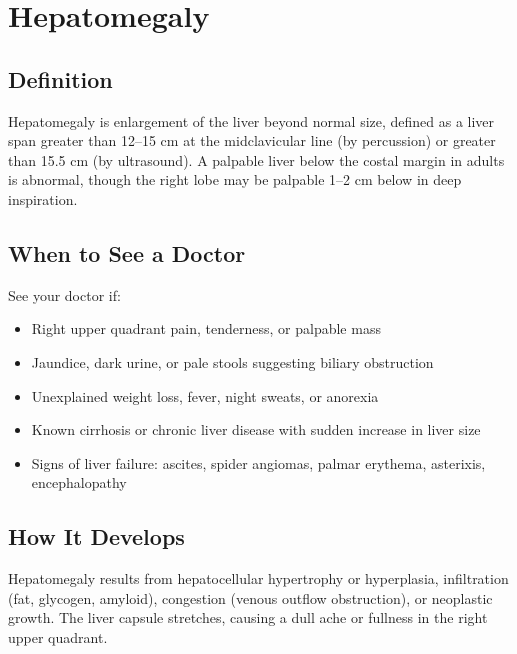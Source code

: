 \chapter{Hepatomegaly}

\section*{Definition}
Hepatomegaly is enlargement of the liver beyond normal size, defined as a liver span greater than 12--15 cm at the midclavicular line (by percussion) or greater than 15.5 cm (by ultrasound). A palpable liver below the costal margin in adults is abnormal, though the right lobe may be palpable 1--2 cm below in deep inspiration.

\section*{When to See a Doctor}
See your doctor if:
\begin{itemize}
  \item Right upper quadrant pain, tenderness, or palpable mass
  \item Jaundice, dark urine, or pale stools suggesting biliary obstruction
  \item Unexplained weight loss, fever, night sweats, or anorexia
  \item Known cirrhosis or chronic liver disease with sudden increase in liver size
  \item Signs of liver failure: ascites, spider angiomas, palmar erythema, asterixis, encephalopathy
\end{itemize}

\section*{How It Develops}
Hepatomegaly results from hepatocellular hypertrophy or hyperplasia, infiltration (fat, glycogen, amyloid), congestion (venous outflow obstruction), or neoplastic growth. The liver capsule stretches, causing a dull ache or fullness in the right upper quadrant.

